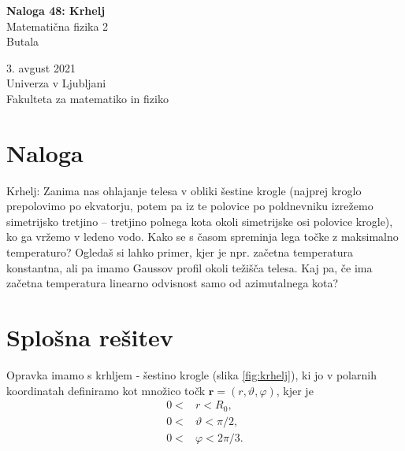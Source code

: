 \documentclass{article}
\def\phi{\varphi}
\def\theta{\vartheta}
\newcommand{\vect}[1]{\boldsymbol{#1}}
\begin{document}
\begin{titlepage}
\begin{center}
	
	\vspace*{5cm}
	\LARGE\textbf{Naloga 48: Krhelj}\\
	\vspace{0.2cm}
	\Large	Matematična fizika 2\\
	\vspace{1.6cm}
	 Butala\\
 
       \vfill 
       \vspace{0.8cm}
	\normalsize
 
       3. avgust 2021\\
	\vspace{0.2cm}
       Univerza v Ljubljani\\
       Fakulteta za matematiko in fiziko\\
      
 
\end{center}
\end{titlepage}


	\newpage


	\section{Naloga}
Krhelj: Zanima nas ohlajanje telesa v obliki šestine krogle (najprej kroglo prepolovimo po
ekvatorju, potem pa iz te polovice po poldnevniku izrežemo simetrijsko tretjino – tretjino
polnega kota okoli simetrijske osi polovice krogle), ko ga vržemo v ledeno vodo. Kako se
s časom spreminja lega točke z maksimalno temperaturo? Ogledaš si lahko primer, kjer
je npr. začetna temperatura konstantna, ali pa imamo Gaussov profil okoli težišča telesa.
Kaj pa, če ima začetna temperatura linearno odvisnost samo od azimutalnega kota?

\bigskip








\section{Splošna rešitev}

Opravka imamo s krhljem - šestino krogle (slika \ref{fig:krhelj}), ki jo v polarnih koordinatah definiramo kot množico točk $\vect r = (r, \theta, \phi)$, kjer je
\begin{align*}
0<&r<R_0, \\
0<&\theta<\pi/2, \\
0<&\phi<2\pi /3.
\end{align*}
\end{document}
